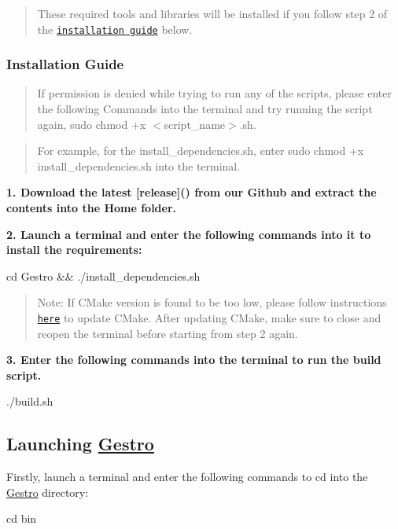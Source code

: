 \begin{quote}
These required tools and libraries will be installed if you follow step 2 of the \href{#installation-guide}{\tt installation guide} below. \end{quote}


\subsubsection*{Installation Guide}

\begin{quote}
If permission is denied while trying to run any of the scripts, please enter the following Commands into the terminal and try running the script again, {\ttfamily sudo chmod +x $<$script\+\_\+name$>$.sh}. \end{quote}


\begin{quote}
For example, for the install\+\_\+dependencies.\+sh, enter {\ttfamily sudo chmod +x install\+\_\+dependencies.\+sh} into the terminal. \end{quote}


{\bfseries 1. Download the latest \mbox{[}release\mbox{]}() from our Github and extract the contents into the Home folder.}

{\bfseries 2. Launch a terminal and enter the following commands into it to install the requirements\+:} 
\begin{DoxyCode}
cd Gestro && ./install\_dependencies.sh
\end{DoxyCode}
 \begin{quote}
Note\+: If C\+Make version is found to be too low, please follow instructions \href{https://askubuntu.com/a/829311}{\tt here} to update C\+Make. After updating C\+Make, make sure to close and reopen the terminal before starting from step 2 again. \end{quote}


{\bfseries 3. Enter the following commands into the terminal to run the build script.} 
\begin{DoxyCode}
./build.sh
\end{DoxyCode}


\subsection*{Launching \hyperlink{namespaceGestro}{Gestro}}

Firstly, launch a terminal and enter the following commands to cd into the \hyperlink{namespaceGestro}{Gestro} directory\+: 
\begin{DoxyCode}
cd bin
\end{DoxyCode}


